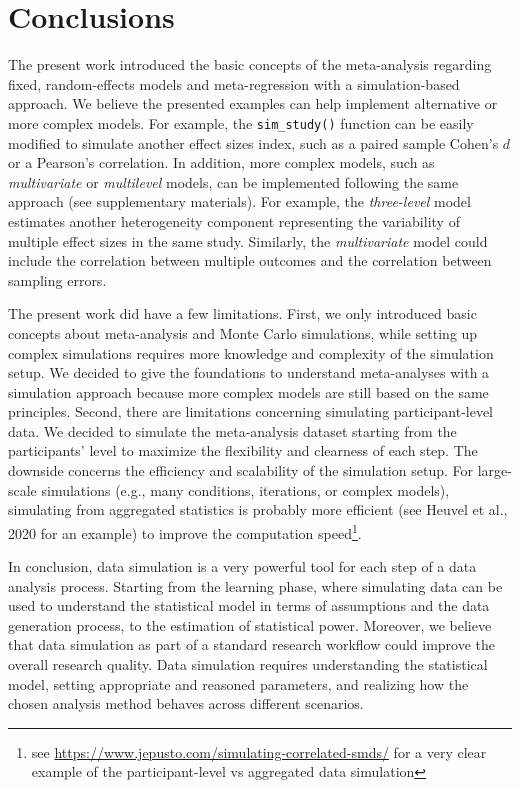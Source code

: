 \documentclass[
  man,floatsintext]{apa6}
\begin{document}
\normalsize

\hypertarget{conclusions}{%
\section{Conclusions}\label{conclusions}}

The present work introduced the basic concepts of the meta-analysis regarding fixed, random-effects models and meta-regression with a simulation-based approach. We believe the presented examples can help implement alternative or more complex models. For example, the \texttt{sim\_study()} function can be easily modified to simulate another effect sizes index, such as a paired sample Cohen's \(d\) or a Pearson's
correlation. In addition, more complex models, such as \emph{multivariate} or \emph{multilevel} models, can be implemented following the same approach (see supplementary materials). For example, the \emph{three-level} model estimates another heterogeneity component representing the variability of multiple effect sizes in the same study. Similarly, the \emph{multivariate} model could include the correlation between multiple outcomes and the correlation between sampling errors.

The present work did have a few limitations. First, we only introduced basic concepts about meta-analysis and Monte Carlo simulations, while setting up complex simulations requires more knowledge and complexity of the simulation setup. We decided to give the foundations to understand meta-analyses with a simulation approach because more complex models are still based on the same principles. Second, there are limitations
concerning simulating participant-level data. We decided to simulate the meta-analysis dataset starting from the participants' level to maximize the flexibility and clearness of each step. The downside concerns the efficiency and scalability of the simulation setup. For large-scale simulations (e.g., many conditions, iterations, or complex models), simulating from aggregated statistics is probably more efficient (see
Heuvel et al., 2020 for an example) to improve the computation speed\footnote{see \url{https://www.jepusto.com/simulating-correlated-smds/} for a very clear example of the participant-level vs aggregated data simulation}.

In conclusion, data simulation is a very powerful tool for each step of a data analysis process. Starting from the learning phase, where simulating data can be used to understand the statistical model in terms of assumptions and the data generation process, to the estimation of statistical power. Moreover, we believe that data simulation as part of a standard research workflow could improve the overall research quality. Data simulation requires understanding the statistical model, setting appropriate and reasoned parameters, and realizing how the chosen analysis method behaves across different scenarios.
\end{document}
